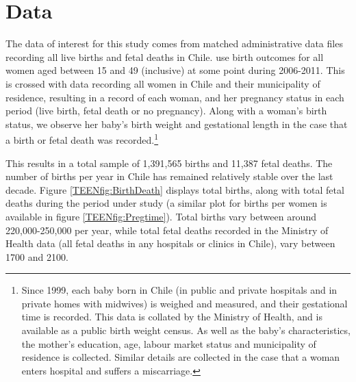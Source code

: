 \section{Data}
\label{TEENscn:Data}
The data of interest for this study comes from matched administrative data files 
recording all live births and fetal deaths in Chile.  \Person use birth outcomes 
for all women aged between 15 and 49 (inclusive) at some point during 2006-2011.  
This is crossed with data recording all women in Chile and their municipality of
residence, resulting in a record of each woman, and her pregnancy status in each 
period (live birth, fetal death or no pregnancy).  Along with a woman's birth 
status, we observe her baby's birth weight and gestational length in the case 
that a birth or fetal death was recorded.\footnote{Since 1999, each baby born in 
Chile (in public and private hospitals and in private homes with midwives) is 
weighed and measured, and their gestational time is recorded.  This data is 
collated by the Ministry of Health, and is available as a public birth weight 
census.  As well as the baby's characteristics, the mother's education, age, 
labour market status and municipality of residence is collected.  Similar 
details are collected in the case that a woman enters hospital and suffers a 
miscarriage.}

This results in a total sample of 1,391,565 births and 11,387 fetal deaths.
The number of births per year in Chile has remained relatively stable over the 
last decade.  Figure \ref{TEENfig:BirthDeath} displays total births, along
with total fetal deaths during the period under study (a similar plot for
births per women is available in figure \ref{TEENfig:Pregtime}).  Total births 
vary between around 220,000-250,000 per year, while total fetal deaths recorded
in the Ministry of Health data (all fetal deaths in any hospitals or clinics 
in Chile), vary between 1700 and 2100.

